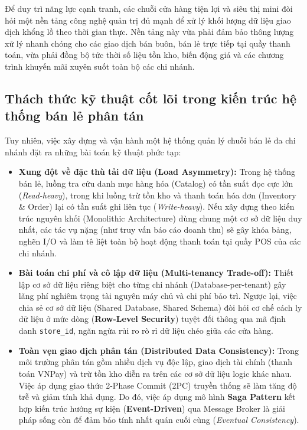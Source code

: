 \documentclass[12pt,a4paper]{report}
\begin{document}
Để duy trì năng lực cạnh tranh, các chuỗi cửa hàng tiện lợi và siêu thị mini đòi hỏi một nền tảng công nghệ quản trị đủ mạnh để xử lý khối lượng dữ liệu giao dịch khổng lồ theo thời gian thực. Nền tảng này vừa phải đảm bảo thông lượng xử lý nhanh chóng cho các giao dịch bán buôn, bán lẻ trực tiếp tại quầy thanh toán, vừa phải đồng bộ tức thời số liệu tồn kho, biến động giá và các chương trình khuyến mãi xuyên suốt toàn bộ các chi nhánh.

\subsection{Thách thức kỹ thuật cốt lõi trong kiến trúc hệ thống bán lẻ phân tán}
Tuy nhiên, việc xây dựng và vận hành một hệ thống quản lý chuỗi bán lẻ đa chi nhánh đặt ra những bài toán kỹ thuật phức tạp:
\begin{itemize}
    \item \textbf{Xung đột về đặc thù tải dữ liệu (Load Asymmetry):} Trong hệ thống bán lẻ, luồng tra cứu danh mục hàng hóa (Catalog) có tần suất đọc cực lớn (\textit{Read-heavy}), trong khi luồng trừ tồn kho và thanh toán hóa đơn (Inventory \& Order) lại có tần suất ghi liên tục (\textit{Write-heavy}). Nếu xây dựng theo kiến trúc nguyên khối (Monolithic Architecture) dùng chung một cơ sở dữ liệu duy nhất, các tác vụ nặng (như truy vấn báo cáo doanh thu) sẽ gây khóa bảng, nghẽn I/O và làm tê liệt toàn bộ hoạt động thanh toán tại quầy POS của các chi nhánh.
    \item \textbf{Bài toán chi phí và cô lập dữ liệu (Multi-tenancy Trade-off):} Thiết lập cơ sở dữ liệu riêng biệt cho từng chi nhánh (Database-per-tenant) gây lãng phí nghiêm trọng tài nguyên máy chủ và chi phí bảo trì. Ngược lại, việc chia sẻ cơ sở dữ liệu (Shared Database, Shared Schema) đòi hỏi cơ chế cách ly dữ liệu ở mức dòng (\textbf{Row-Level Security}) tuyệt đối thông qua mã định danh \texttt{store\_id}, ngăn ngừa rủi ro rò rỉ dữ liệu chéo giữa các cửa hàng.
    \item \textbf{Toàn vẹn giao dịch phân tán (Distributed Data Consistency):} Trong môi trường phân tán gồm nhiều dịch vụ độc lập, giao dịch tài chính (thanh toán VNPay) và trừ tồn kho diễn ra trên các cơ sở dữ liệu logic khác nhau. Việc áp dụng giao thức 2-Phase Commit (2PC) truyền thống sẽ làm tăng độ trễ và giảm tính khả dụng. Do đó, việc áp dụng mô hình \textbf{Saga Pattern} kết hợp kiến trúc hướng sự kiện (\textbf{Event-Driven}) qua Message Broker là giải pháp sống còn để đảm bảo tính nhất quán cuối cùng (\textit{Eventual Consistency}).
\end{itemize}
\end{document}
